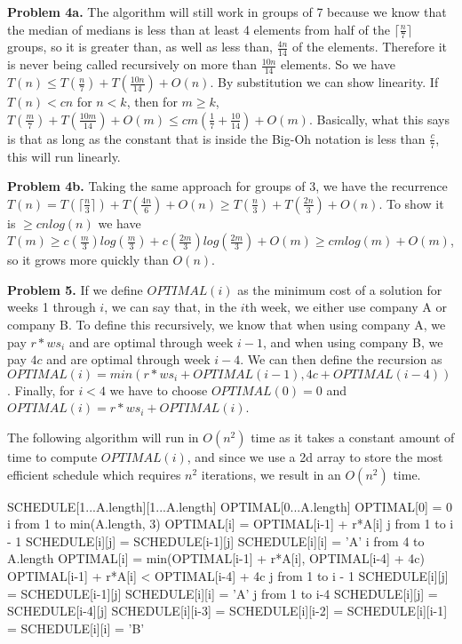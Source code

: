 \documentclass{article}
\begin{document}
\hfill

\textbf{Problem 4a.} The algorithm will still work in groups of 7 because we know that the median of medians is less than at least 4 elements from half of the $\lceil \frac{n}{7} \rceil$ groups, so it is greater than, as well as less than, $\frac{4n}{14}$ of the elements. Therefore it is never being called recursively on more than $\frac{10n}{14}$ elements. So we have $T(n) \leq T(\frac{n}{7}) + T(\frac{10n}{14}) + O(n)$. By substitution we can show linearity. If $T(n) < cn$ for $n < k$, then for $m \geq k$, $T(\frac{m}{7}) + T(\frac{10m}{14}) + O(m) \leq cm(\frac{1}{7} + \frac{10}{14}) + O(m)$. Basically, what this says is that as long as the constant that is inside the Big-Oh notation is less than $\frac{c}{7}$, this will run linearly. 

\hfill

\textbf{Problem 4b.} Taking the same approach for groups of 3, we have the recurrence $T(n) = T(\lceil \frac{n}{3} \rceil) + T(\frac{4n}{6}) + O(n) \geq T(\frac{n}{3}) + T(\frac{2n}{3}) + O(n)$. To show it is $\geq cnlog(n)$ we have $T(m) \geq c(\frac{m}{3})log(\frac{m}{3}) + c(\frac{2m}{3})log(\frac{2m}{3}) + O(m) \geq cmlog(m) + O(m)$, so it grows more quickly than $O(n)$.

\hfill

\textbf{Problem 5.} If we define $OPTIMAL(i)$ as the minimum cost of a solution for weeks 1 through $i$, we can say that, in the $i$th week, we either use company A or company B. To define this recursively, we know that when using company A, we pay $r*ws_i$ and are optimal through week $i-1$, and when using company B, we pay $4c$ and are optimal through week $i-4$. We can then define the recursion as $OPTIMAL(i) = min(r*ws_i + OPTIMAL(i - 1), 4c + OPTIMAL(i - 4))$. Finally, for $i < 4$ we have to choose $OPTIMAL(0) = 0$ and $OPTIMAL(i) = r*ws_i + OPTIMAL(i)$.

\hfill

The following algorithm will run in $O(n^2)$ time as it takes a constant amount of time to compute $OPTIMAL(i)$, and since we use a 2d array to store the most efficient schedule which requires $n^2$ iterations, we result in an $O(n^2)$ time. 

\begin{codebox}
    \li SCHEDULE[1...A.length][1...A.length]
    \li OPTIMAL[0...A.length]
    \li
    \li OPTIMAL[0] = 0
    \li \For i from 1 to min(A.length, 3) \Do
    \li OPTIMAL[i] = OPTIMAL[i-1] + r*A[i]
    \li \For j from 1 to i - 1 \Do
    \li SCHEDULE[i][j] = SCHEDULE[i-1][j] \End
    \li SCHEDULE[i][i] = 'A' \End
    \li
    \li \For i from 4 to A.length \Do
    \li OPTIMAL[i] = min(OPTIMAL[i-1] + r*A[i], OPTIMAL[i-4] + 4c)
    \li \If OPTIMAL[i-1] + r*A[i] < OPTIMAL[i-4] + 4c \Then
    \li \For j from 1 to i - 1 \Do
    \li SCHEDULE[i][j] = SCHEDULE[i-1][j] \End
    \li SCHEDULE[i][i] = 'A' 
    \li \Else
    \li \For j from 1 to i-4 \Do
    \li SCHEDULE[i][j] = SCHEDULE[i-4][j] \End
    \li SCHEDULE[i][i-3] = SCHEDULE[i][i-2] = SCHEDULE[i][i-1] = SCHEDULE[i][i] = 'B' \End
\end{codebox}
\end{document}
